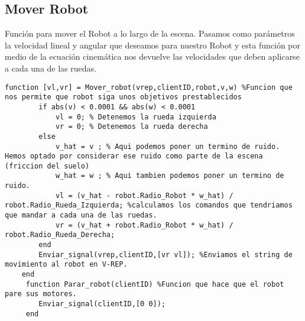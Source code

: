 \subsection{Mover Robot}
Función para mover el Robot a lo largo de la escena. 
Pasamos como parámetros la velocidad lineal y angular que deseamos para nuestro Robot y esta función por medio de la ecuación cinemática nos devuelve las velocidades que deben aplicarse a cada una de las ruedas.
\begin{lstlisting}[frame=single]
function [vl,vr] = Mover_robot(vrep,clientID,robot,v,w) %Funcion que nos permite que robot siga unos objetivos prestablecidos
        if abs(v) < 0.0001 && abs(w) < 0.0001
            vl = 0; % Detenemos la rueda izquierda
            vr = 0; % Detenemos la rueda derecha
        else
            v_hat = v ; % Aqui podemos poner un termino de ruido. Hemos optado por considerar ese ruido como parte de la escena (friccion del suelo)
            w_hat = w ; % Aqui tambien podemos poner un termino de ruido.
            vl = (v_hat - robot.Radio_Robot * w_hat) / robot.Radio_Rueda_Izquierda; %calculamos los comandos que tendriamos que mandar a cada una de las ruedas.
            vr = (v_hat + robot.Radio_Robot * w_hat) / robot.Radio_Rueda_Derecha;   
        end 
        Enviar_signal(vrep,clientID,[vr vl]); %Enviamos el string de movimiento al robot en V-REP. 
    end
     function Parar_robot(clientID) %Funcion que hace que el robot pare sus motores.
        Enviar_signal(clientID,[0 0]);
     end
\end{lstlisting}
